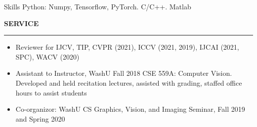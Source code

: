 \documentclass{resume} %
\newcommand{\B}[1]{\textbf{#1}}
\begin{document}


  \begin{rSection}{Skills}
  Python: Numpy, Tensorflow, PyTorch. C/C++. Matlab
  \end{rSection}

  \sectionskip
  \MakeUppercase{\bf Service} %
  \sectionlineskip
  \hrule %

  \begin{itemize}
  \item Reviewer for IJCV, TIP, CVPR (2021), ICCV (2021, 2019), IJCAI (2021, SPC), WACV (2020)\\
  \vspace{-1em}
  \item Assistant to Instructor, WashU Fall 2018 CSE 559A: Computer Vision. Developed and held recitation lectures, assisted with grading, staffed office hours to assist students\\
  \vspace{-1em}
  \item Co-organizor: WashU CS Graphics, Vision, and Imaging Seminar, Fall 2019 and Spring 2020
  \end{itemize}









  
\end{document}
